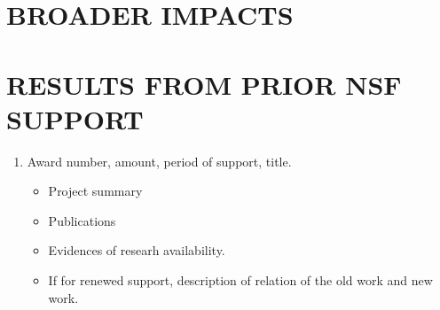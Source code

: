 \documentclass[./proposal.tex]{subfiles}
\begin{document}
%
%
\section{BROADER IMPACTS} %
%
%


%
%
\section{RESULTS FROM PRIOR NSF SUPPORT} %
%
% 
%
%
\begin{enumerate}
    \item Award number, amount, period of support, title. 
    \begin{itemize}
        \item      Project summary
        \item      Publications
        \item      Evidences of researh availability.
        \item      If for renewed support, description of relation of the old work and new work.
    \end{itemize}
     
\end{enumerate}

\newpage

%
%

\renewcommand\refname{References Cited}






\end{document}
